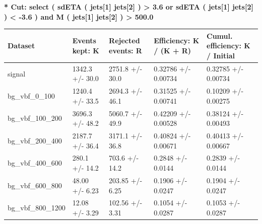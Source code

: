 \documentclass[a4paper, 10pt]{article}
\begin{document}
\textbf{* Cut: select ( sdETA ( jets[1] jets[2] ) > 3.6 or sdETA ( jets[1] jets[2] ) < -3.6 ) and M ( jets[1] jets[2] ) > 500.0}\\
   \begin{table}[H]
  \begin{center}
    \begin{tabular}{|m{20.0mm}|m{27.0mm}|m{27.0mm}|m{33.0mm}|m{32.0mm}|}
      \hline
      {\cellcolor{yellow}         Dataset}& {\cellcolor{yellow}         Events kept:
          K}& {\cellcolor{yellow}         Rejected events:
          R}& {\cellcolor{yellow}         Efficiency:
          K /\- (K + R)}& {\cellcolor{yellow}         Cumul. efficiency:
          K /\- Initial}\\
      \hline
      {\cellcolor{white}         signal}& {\cellcolor{white}         1342.3 +/\-- 30.0}& {\cellcolor{white}         2751.8 +/\-- 30.0}& {\cellcolor{white}         0.32786 +/\-- 0.00734}& {\cellcolor{white}         0.32785 +/\-- 0.00734}\\
      \hline
      {\cellcolor{white}         bg\_vbf\_0\_100}& {\cellcolor{white}         1240.4 +/\-- 33.5}& {\cellcolor{white}         2694.3 +/\-- 46.1}& {\cellcolor{white}         0.31525 +/\-- 0.00741}& {\cellcolor{white}         0.10209 +/\-- 0.00275}\\
      \hline
      {\cellcolor{white}         bg\_vbf\_100\_200}& {\cellcolor{white}         3696.3 +/\-- 48.2}& {\cellcolor{white}         5060.7 +/\-- 49.9}& {\cellcolor{white}         0.42209 +/\-- 0.00528}& {\cellcolor{white}         0.38124 +/\-- 0.00493}\\
      \hline
      {\cellcolor{white}         bg\_vbf\_200\_400}& {\cellcolor{white}         2187.7 +/\-- 36.4}& {\cellcolor{white}         3171.1 +/\-- 36.8}& {\cellcolor{white}         0.40824 +/\-- 0.00671}& {\cellcolor{white}         0.40413 +/\-- 0.00667}\\
      \hline
      {\cellcolor{white}         bg\_vbf\_400\_600}& {\cellcolor{white}         280.1 +/\-- 14.2}& {\cellcolor{white}         703.6 +/\-- 14.2}& {\cellcolor{white}         0.2848 +/\-- 0.0144}& {\cellcolor{white}         0.2839 +/\-- 0.0144}\\
      \hline
      {\cellcolor{white}         bg\_vbf\_600\_800}& {\cellcolor{white}         48.00 +/\-- 6.23}& {\cellcolor{white}         203.85 +/\-- 6.25}& {\cellcolor{white}         0.1906 +/\-- 0.0247}& {\cellcolor{white}         0.1904 +/\-- 0.0247}\\
      \hline
      {\cellcolor{white}         bg\_vbf\_800\_1200}& {\cellcolor{white}         12.08 +/\-- 3.29}& {\cellcolor{white}         102.56 +/\-- 3.31}& {\cellcolor{white}         0.1054 +/\-- 0.0287}& {\cellcolor{white}         0.1053 +/\-- 0.0287}\\

\end{tabular}
\end{center}
\end{table}
\end{document}
